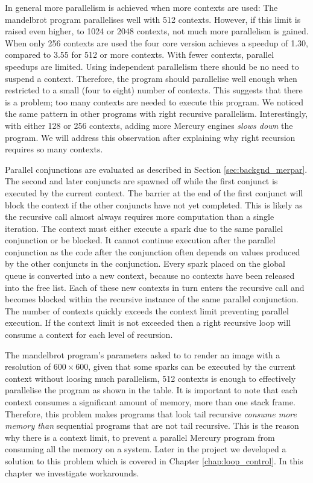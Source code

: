 In general more parallelism is achieved when more contexts are used:
The mandelbrot program parallelises well with 512 contexts.
However,
if this limit is raised even higher,
to 1024 or 2048 contexts,
not much more parallelism is gained.
When only 256 contexts are used the four core version achieves a speedup
of 1.30,
compared to 3.55 for 512 or more contexts.
With fewer contexts, parallel speedups are limited.
Using independent parallelism there should be no need to suspend a context.
Therefore, the program should parallelise well enough when restricted to
a small (four to eight) number of contexts.
This suggests that there is a problem;
too many contexts are needed to execute this program.
We noticed the same pattern in other programs with right recursive
parallelism.
Interestingly,
with either 128 or 256 contexts,
adding more Mercury engines \emph{slows down} the program.
We will address this observation after explaining why right recursion
requires so many contexts.

Parallel conjunctions are evaluated as described in Section
\ref{sec:backgnd_merpar}.
The second and later conjuncts are spawned off while the first conjunct is
executed by the current context.
The barrier at the end of the first conjunct will block the context if
the other conjuncts have not yet completed.
This is likely as the recursive call almost always requires more
computation than a single iteration.
The context must either execute a spark due to the same parallel
conjunction or be blocked.
It cannot continue execution after the parallel conjunction as the code
after the conjunction often depends on values produced by the other
conjuncts in the conjunction.
Every spark placed on the global queue is converted into a new context,
because no contexts have been released into the free list.
Each of these new contexts in turn enters the recursive call and
becomes blocked within the recursive instance of the same parallel
conjunction.
The number of contexts quickly exceeds the context limit preventing
parallel execution.
If the context limit is not exceeded then a right recursive loop will
consume a context for each level of recursion.

The mandelbrot program's parameters asked to to render an image with a
resolution of $600\times600$,
given that some sparks can be executed by the current context without
loosing much parallelism,
512 contexts is enough to effectively parallelise the program as shown in
the table.
It is important to note that each context consumes a significant amount
of memory, more than one stack frame.
Therefore,
this problem makes programs that look tail recursive
\emph{consume more memory than}
sequential programs that are not tail recursive.
This is the reason why there is a context limit,
to prevent a parallel Mercury program from consuming all the memory on a
system.
Later in the project we developed a solution to this problem which is
covered in Chapter \ref{chap:loop_control}.
In this chapter we investigate workarounds.

